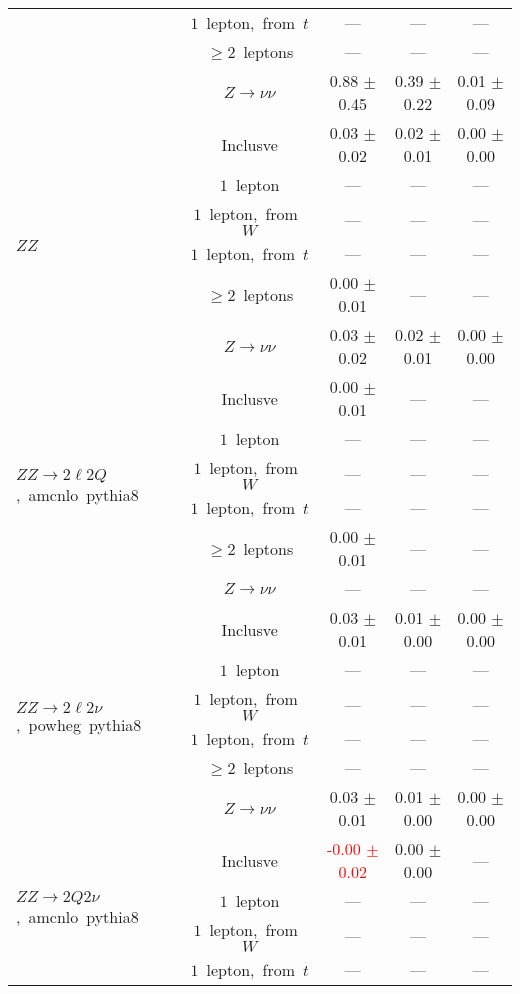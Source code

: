 \documentclass{article}
\begin{document}
\begin{longtable}{|l|c|c|c|c|}
 & $1$~lepton,~from~$t$  & ---  & ---  & --- \\* 
 & $\ge2$~leptons  & ---  & ---  & --- \\* 
 & $Z\rightarrow\nu\nu$  & 0.88 $\pm$ 0.45  & 0.39 $\pm$ 0.22  & 0.01 $\pm$ 0.09 \\* 
\hline 
\multirow{6}{*}{$ZZ$} & Inclusve  & 0.03 $\pm$ 0.02  & 0.02 $\pm$ 0.01  & 0.00 $\pm$ 0.00 \\* 
 & $1$~lepton  & ---  & ---  & --- \\* 
 & $1$~lepton,~from~$W$  & ---  & ---  & --- \\* 
 & $1$~lepton,~from~$t$  & ---  & ---  & --- \\* 
 & $\ge2$~leptons  & 0.00 $\pm$ 0.01  & ---  & --- \\* 
 & $Z\rightarrow\nu\nu$  & 0.03 $\pm$ 0.02  & 0.02 $\pm$ 0.01  & 0.00 $\pm$ 0.00 \\* 
\hline 
\multirow{6}{*}{$ZZ{\rightarrow}2{\ell}2Q$,~amcnlo~pythia8} & Inclusve  & 0.00 $\pm$ 0.01  & ---  & --- \\* 
 & $1$~lepton  & ---  & ---  & --- \\* 
 & $1$~lepton,~from~$W$  & ---  & ---  & --- \\* 
 & $1$~lepton,~from~$t$  & ---  & ---  & --- \\* 
 & $\ge2$~leptons  & 0.00 $\pm$ 0.01  & ---  & --- \\* 
 & $Z\rightarrow\nu\nu$  & ---  & ---  & --- \\* 
\hline 
\multirow{6}{*}{$ZZ{\rightarrow}2{\ell}2{\nu}$,~powheg~pythia8} & Inclusve  & 0.03 $\pm$ 0.01  & 0.01 $\pm$ 0.00  & 0.00 $\pm$ 0.00 \\* 
 & $1$~lepton  & ---  & ---  & --- \\* 
 & $1$~lepton,~from~$W$  & ---  & ---  & --- \\* 
 & $1$~lepton,~from~$t$  & ---  & ---  & --- \\* 
 & $\ge2$~leptons  & ---  & ---  & --- \\* 
 & $Z\rightarrow\nu\nu$  & 0.03 $\pm$ 0.01  & 0.01 $\pm$ 0.00  & 0.00 $\pm$ 0.00 \\* 
\hline 
\multirow{6}{*}{$ZZ{\rightarrow}2Q2{\nu}$,~amcnlo~pythia8} & Inclusve  & \textcolor{red}{ -0.00 $\pm$ 0.02 }  & 0.00 $\pm$ 0.00  & --- \\* 
 & $1$~lepton  & ---  & ---  & --- \\* 
 & $1$~lepton,~from~$W$  & ---  & ---  & --- \\* 
 & $1$~lepton,~from~$t$  & ---  & ---  & --- \\* 

\end{longtable}
\end{document}
